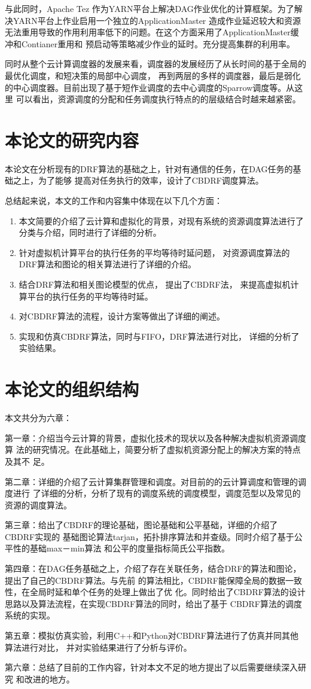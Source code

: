 与此同时，Apache Tez 作为YARN平台上解决DAG作业优化的计算框架。为了解决YARN平台上作业启用一个独立的ApplicationMaster
造成作业延迟较大和资源无法重用导致的作用利用率低下的问题。在这个方面采用了ApplicationMaster缓冲和Contianer重用和
预启动等策略减少作业的延时。充分提高集群的利用率。

同时从整个云计算调度器的发展来看，调度器的发展经历了从长时间的基于全局的最优化调度，和短决策的局部中心调度，
再到两层的多样的调度器，最后是弱化的中心调度器。目前出现了基于短作业调度的去中心调度的Sparrow调度等。从这里
可以看出，资源调度的分配和任务调度执行特点的的层级结合时越来越紧密。

\section{本论文的研究内容}
本论文在分析现有的DRF算法的基础之上，针对有通信的任务，在DAG任务的基础之上，为了能够
提高对任务执行的效率，设计了CBDRF调度算法。

总结起来说，本文的工作和内容集中体现在以下几个方面：
\begin{enumerate}
  \item 本文简要的介绍了云计算和虚拟化的背景，对现有系统的资源调度算法进行了
	分类与介绍，同时进行了详细的分析。
  \item 针对虚拟机计算平台的执行任务的平均等待时延问题，
	对资源调度算法的DRF算法和图论的相关算法进行了详细的介绍。
  \item 结合DRF算法和相关图论模型的优点，
	提出了CBDRF法，
	来提高虚拟机计算平台的执行任务的平均等待时延。
  \item 对CBDRF算法的流程，设计方案等做出了详细的阐述。
  \item 实现和仿真CBDRF算法，同时与FIFO，DRF算法进行对比，
	详细的分析了实验结果。
\end{enumerate}


\section{本论文的组织结构}
本文共分为六章：

第一章：介绍当今云计算的背景，虚拟化技术的现状以及各种解决虚拟机资源调度算
法的研究情况。在此基础上，简要分析了虚拟机资源分配上的解决方案的特点及其不
足。

第二章：详细的介绍了云计算集群管理和调度。对目前的的云计算调度和管理的调度进行
了详细的分析，分析了现有的调度系统的调度模型，调度范型以及常见的资源的调度算法。

第三章：给出了CBDRF的理论基础，图论基础和公平基础，详细的介绍了CBDRF实现的
基础图论算法tarjan，拓扑排序算法和并查级。同时介绍了基于公平性的基础max－min算法
和公平的度量指标简氏公平指数。

第四章：在DAG任务基础之上，介绍了存在关联任务，结合DRF的算法和图论，提出了自己的CBDRF算法。与先前
的算法相比，CBDRF能保障全局的数据一致性，在全局时延和单个任务的处理上做出了优
化。同时给出了CBDRF算法的设计思路以及算法流程，在实现CBDRF算法的同时，给出了基于
CBDRF算法的调度系统的实现。

第五章：模拟仿真实验，利用C++和Python对CBDRF算法进行了仿真并同其他算法进行对比，
并对实验结果进行了分析与评价。

第六章：总结了目前的工作内容，针对本文不足的地方提出了以后需要继续深入研究
和改进的地方。
